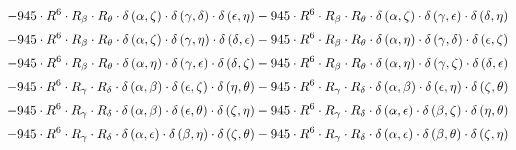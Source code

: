 \begin{subequations}
\begin{gather}
 \\[0.2em] \notag 		 - 945 \cdot R^{6} \cdot R_{\beta{}} \cdot R_{\theta{}} \cdot \delta{}\left(\alpha{}, \zeta{}\right) \cdot \delta{}\left(\gamma{}, \delta{}\right) \cdot \delta{}\left(\epsilon{}, \eta{}\right)- 945 \cdot R^{6} \cdot R_{\beta{}} \cdot R_{\theta{}} \cdot \delta{}\left(\alpha{}, \zeta{}\right) \cdot \delta{}\left(\gamma{}, \epsilon{}\right) \cdot \delta{}\left(\delta{}, \eta{}\right) 
 \\[0.2em] \notag 		 - 945 \cdot R^{6} \cdot R_{\beta{}} \cdot R_{\theta{}} \cdot \delta{}\left(\alpha{}, \zeta{}\right) \cdot \delta{}\left(\gamma{}, \eta{}\right) \cdot \delta{}\left(\delta{}, \epsilon{}\right)- 945 \cdot R^{6} \cdot R_{\beta{}} \cdot R_{\theta{}} \cdot \delta{}\left(\alpha{}, \eta{}\right) \cdot \delta{}\left(\gamma{}, \delta{}\right) \cdot \delta{}\left(\epsilon{}, \zeta{}\right) 
 \\[0.2em] \notag 		 - 945 \cdot R^{6} \cdot R_{\beta{}} \cdot R_{\theta{}} \cdot \delta{}\left(\alpha{}, \eta{}\right) \cdot \delta{}\left(\gamma{}, \epsilon{}\right) \cdot \delta{}\left(\delta{}, \zeta{}\right)- 945 \cdot R^{6} \cdot R_{\beta{}} \cdot R_{\theta{}} \cdot \delta{}\left(\alpha{}, \eta{}\right) \cdot \delta{}\left(\gamma{}, \zeta{}\right) \cdot \delta{}\left(\delta{}, \epsilon{}\right) 
 \\[0.2em] \notag 		 - 945 \cdot R^{6} \cdot R_{\gamma{}} \cdot R_{\delta{}} \cdot \delta{}\left(\alpha{}, \beta{}\right) \cdot \delta{}\left(\epsilon{}, \zeta{}\right) \cdot \delta{}\left(\eta{}, \theta{}\right)- 945 \cdot R^{6} \cdot R_{\gamma{}} \cdot R_{\delta{}} \cdot \delta{}\left(\alpha{}, \beta{}\right) \cdot \delta{}\left(\epsilon{}, \eta{}\right) \cdot \delta{}\left(\zeta{}, \theta{}\right) 
 \\[0.2em] \notag 		 - 945 \cdot R^{6} \cdot R_{\gamma{}} \cdot R_{\delta{}} \cdot \delta{}\left(\alpha{}, \beta{}\right) \cdot \delta{}\left(\epsilon{}, \theta{}\right) \cdot \delta{}\left(\zeta{}, \eta{}\right)- 945 \cdot R^{6} \cdot R_{\gamma{}} \cdot R_{\delta{}} \cdot \delta{}\left(\alpha{}, \epsilon{}\right) \cdot \delta{}\left(\beta{}, \zeta{}\right) \cdot \delta{}\left(\eta{}, \theta{}\right) 
 \\[0.2em] \notag 		 - 945 \cdot R^{6} \cdot R_{\gamma{}} \cdot R_{\delta{}} \cdot \delta{}\left(\alpha{}, \epsilon{}\right) \cdot \delta{}\left(\beta{}, \eta{}\right) \cdot \delta{}\left(\zeta{}, \theta{}\right)- 945 \cdot R^{6} \cdot R_{\gamma{}} \cdot R_{\delta{}} \cdot \delta{}\left(\alpha{}, \epsilon{}\right) \cdot \delta{}\left(\beta{}, \theta{}\right) \cdot \delta{}\left(\zeta{}, \eta{}\right) 

\end{gather}
\end{subequations}
